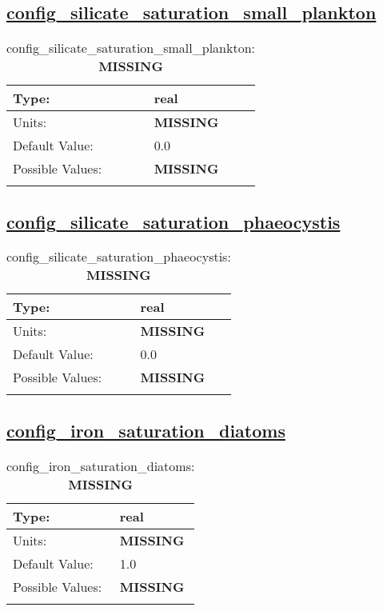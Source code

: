 \subsection[config\_silicate\_saturation\_small\_plankton]{\hyperref[sec:nm_tab_biogeochemistry]{config\_silicate\_saturation\_small\_plankton}}
\label{subsec:nm_sec_config_silicate_saturation_small_plankton}
\begin{center}
\begin{longtable}{| p{2.0in} || p{4.0in} |}
    \hline
    Type: & real \\
    \hline
    Units: & {\bf \color{red} MISSING} \\
    \hline
    Default Value: & 0.0 \\
    \hline
    Possible Values: & {\bf \color{red} MISSING} \\
    \hline
    \caption{config\_silicate\_saturation\_small\_plankton: {\bf \color{red} MISSING}}
\end{longtable}
\end{center}
\subsection[config\_silicate\_saturation\_phaeocystis]{\hyperref[sec:nm_tab_biogeochemistry]{config\_silicate\_saturation\_phaeocystis}}
\label{subsec:nm_sec_config_silicate_saturation_phaeocystis}
\begin{center}
\begin{longtable}{| p{2.0in} || p{4.0in} |}
    \hline
    Type: & real \\
    \hline
    Units: & {\bf \color{red} MISSING} \\
    \hline
    Default Value: & 0.0 \\
    \hline
    Possible Values: & {\bf \color{red} MISSING} \\
    \hline
    \caption{config\_silicate\_saturation\_phaeocystis: {\bf \color{red} MISSING}}
\end{longtable}
\end{center}
\subsection[config\_iron\_saturation\_diatoms]{\hyperref[sec:nm_tab_biogeochemistry]{config\_iron\_saturation\_diatoms}}
\label{subsec:nm_sec_config_iron_saturation_diatoms}
\begin{center}
\begin{longtable}{| p{2.0in} || p{4.0in} |}
    \hline
    Type: & real \\
    \hline
    Units: & {\bf \color{red} MISSING} \\
    \hline
    Default Value: & 1.0 \\
    \hline
    Possible Values: & {\bf \color{red} MISSING} \\
    \hline
    \caption{config\_iron\_saturation\_diatoms: {\bf \color{red} MISSING}}
\end{longtable}
\end{center}
